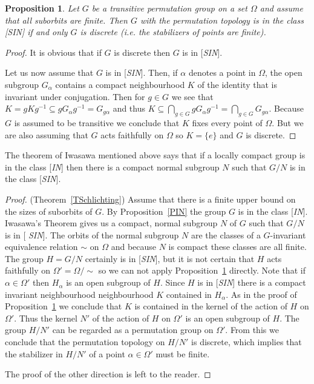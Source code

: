 \documentclass{emsprocart}
\newtheorem{proposition}[theorem]{Proposition}
\theoremstyle{definition}
\begin{document}
\bigskip

\begin{proposition}\label{PSIN}
Let $G$ be a transitive permutation group on a set $\Omega$ and
assume that all suborbits are finite.  Then $G$ with the permutation
topology is in the class [{SIN}] if and only $G$ is discrete
(i.e. the stabilizers of points are finite).
\end{proposition}

\begin{proof}  It is obvious that if $G$ is discrete then $G$ is
in [{\em SIN}].

Let us now assume that $G$ is in [{\em SIN}].  Then, if $\alpha$
denotes a point in $\Omega$,  the open subgroup $G_\alpha$ contains a compact
neighbourhood $K$ of the identity that is invariant under conjugation.
Then for $g\in G$ we see that $K=gKg^{-1}\subseteq gG_\alpha
g^{-1}=G_{g\alpha}$ and
thus $K\subseteq \bigcap_{g\in G}gG_\alpha g^{-1}=\bigcap_{g\in G}
G_{g\alpha}$.
Because $G$ is
assumed to be transitive we conclude that $K$ fixes every point of
$\Omega$.  But we are also assuming that $G$ acts faithfully on $\Omega$ so
$K=\{e\}$
and $G$ is discrete.  \end{proof}

\bigskip

The theorem of Iwasawa mentioned above says that if a locally compact
group is in the class [{\em IN}] then there is a compact normal subgroup $N$
such that $G/N$ is in the class [{\em SIN}].

\bigskip

\begin{proof}  (Theorem~\ref{TSchlichting})  Assume that there is a
finite upper bound on the sizes of suborbits of $G$.
By Proposition~\ref{PIN} the
group $G$ is in the class [{\em IN}].  Iwasawa's Theorem gives us a
compact, normal subgroup $N$ of $G$ such that $G/N$ is in  [{\em
    SIN}].  The orbits of the normal subgroup $N$ are the classes of a
$G$-invariant equivalence relation $\sim$ on $\Omega$
and because $N$ is compact
these classes are all finite. The group $H=G/N$ certainly
is in [{\em SIN}], but it is not certain that $H$ acts faithfully on
$\Omega'=\Omega/\sim$ so we can not apply Proposition~\ref{PSIN} directly.
Note that if $\alpha\in\Omega'$ then $H_\alpha$ is an open subgroup of
$H$.  Since $H$ is in  [{\em SIN}] there is a compact invariant
neighbourhood neighbourhood $K$ contained in $H_\alpha$.  As in the
proof of Proposition~\ref{PSIN} we conclude that $K$ is contained in
the kernel of the action of $H$ on $\Omega'$.  Thus the kernel $N'$ of the
action of $H$ on $\Omega'$ is an open subgroup of $H$.  The group
$H/N'$ can be regarded as a permutation group on $\Omega'$.  From this we
conclude that the permutation topology on $H/N'$ is discrete, which
implies that the stabilizer in $H/N'$ of a point $\alpha\in \Omega'$
must be finite.

The proof of the other direction is left to the reader.  \end{proof}
\end{document}
